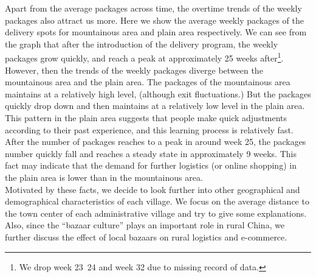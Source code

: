 \documentclass{article}
\begin{document}
\mbox{\hspace{2em}}
Apart from the average packages across time, the overtime trends of the weekly packages also attract us more. Here we show the average weekly packages of the delivery spots for mountainous area and plain area respectively. We can see from the graph that after the introduction of the delivery program, the weekly packages grow quickly, and reach a peak at approximately 25 weeks after\footnote{We drop week 23~24 and week 32 due to missing record of data.}. However, then the trends of the weekly packages diverge between the mountainous area and the plain area. The packages of the mountainous area maintains at a relatively high level, (although exit fluctuations.) But the packages quickly drop down and then maintains at a relatively low level in the plain area. This pattern in the plain area suggests that people make quick adjustments according to their past experience, and this learning process is relatively fast. After the number of packages reaches to a peak in around week 25, the packages number quickly fall and reaches a steady state in approximately 9 weeks. This fact may indicate that the demand for further logistics (or online shopping) in the plain area is lower than in the mountainous area.\\
\mbox{\hspace{2em}}
Motivated by these facts, we decide to look further into other geographical and demographical characteristics of each village. We focus on the average distance to the town center of each administrative village and try to give some explanations. Also, since the “bazaar culture” plays an important role in rural China, we further discuss the effect of local bazaars on rural logistics and e-commerce.\\
\end{document}

